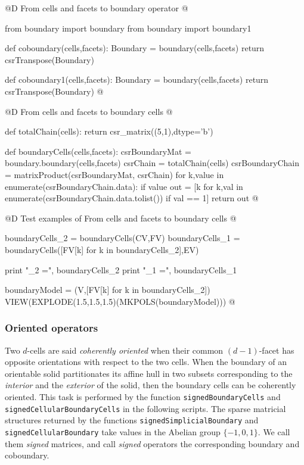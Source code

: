 \documentclass[11pt,oneside]{article}    %
\begin{document}
@D From cells and facets to boundary operator
@{from boundary import boundary
from boundary import boundary1

def coboundary(cells,facets):
    Boundary = boundary(cells,facets)
    return csrTranspose(Boundary)

def coboundary1(cells,facets):
    Boundary = boundary(cells,facets)
    return csrTranspose(Boundary)
@}
@D From cells and facets to boundary cells
@{def totalChain(cells):
    return csr_matrix((5,1),dtype='b')

def boundaryCells(cells,facets):
    csrBoundaryMat = boundary.boundary(cells,facets)
    csrChain = totalChain(cells)
    csrBoundaryChain = matrixProduct(csrBoundaryMat, csrChain)
    for k,value in enumerate(csrBoundaryChain.data):
        if value %
    out = [k for k,val in enumerate(csrBoundaryChain.data.tolist()) if val == 1]
    return out
@}
@D Test examples of From cells and facets to boundary cells
@{boundaryCells_2 = boundaryCells(CV,FV)
boundaryCells_1 = boundaryCells([FV[k] for k in boundaryCells_2],EV)

print "\nboundaryCells_2 =\n", boundaryCells_2
print "\nboundaryCells_1 =\n", boundaryCells_1

boundaryModel = (V,[FV[k] for k in boundaryCells_2])
VIEW(EXPLODE(1.5,1.5,1.5)(MKPOLS(boundaryModel)))
@}



\subsubsection{Oriented operators}

Two $d$-cells are said \emph{coherently oriented} when their common $(d-1)$-facet has opposite orientations with respect to the two cells. When the boundary of an orientable solid partitionates its affine hull in two subsets corresponding to the \emph{interior} and the \emph{exterior} of the solid, then the boundary cells can be coherently oriented. This task is performed by the function \texttt{signedBoundaryCells} and \texttt{signedCellularBoundaryCells} in the following scripts.
The sparse matricial structures returned by the functions \texttt{signedSimplicialBoundary} and \texttt{signedCellularBoundary} take values in the Abelian group $\{-1,0,1\}$. We call them \emph{signed} matrices, and call \emph{signed} operators the corresponding boundary and coboundary.
\end{document}
